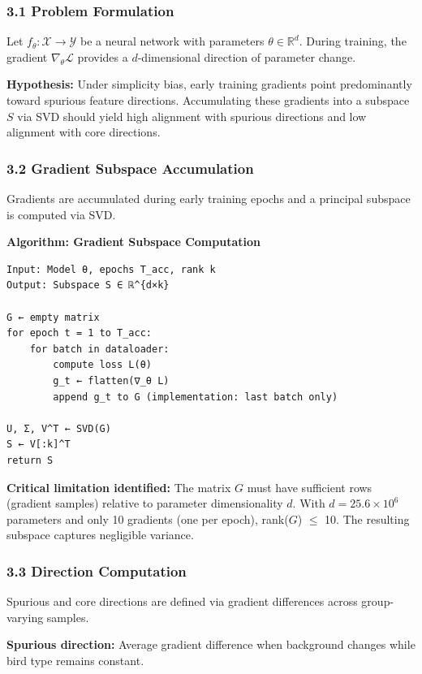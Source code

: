 
\subsubsection{3.1 Problem Formulation}

Let $f_\theta: \mathcal{X} \to \mathcal{Y}$ be a neural network with parameters $\theta \in \mathbb{R}^d$. During training, the gradient $\nabla_\theta \mathcal{L}$ provides a $d$-dimensional direction of parameter change.

\textbf{Hypothesis:} Under simplicity bias, early training gradients point predominantly toward spurious feature directions. Accumulating these gradients into a subspace $S$ via SVD should yield high alignment with spurious directions and low alignment with core directions.

\subsubsection{3.2 Gradient Subspace Accumulation}

Gradients are accumulated during early training epochs and a principal subspace is computed via SVD.

\textbf{Algorithm: Gradient Subspace Computation}

\begin{verbatim}
Input: Model θ, epochs T_acc, rank k
Output: Subspace S ∈ ℝ^{d×k}

G ← empty matrix
for epoch t = 1 to T_acc:
    for batch in dataloader:
        compute loss L(θ)
        g_t ← flatten(∇_θ L)
        append g_t to G (implementation: last batch only)
    
U, Σ, V^T ← SVD(G)
S ← V[:k]^T
return S
\end{verbatim}

\textbf{Critical limitation identified:} The matrix $G$ must have sufficient rows (gradient samples) relative to parameter dimensionality $d$. With $d = 25.6 \times 10^6$ parameters and only 10 gradients (one per epoch), rank($G$) $\leq$ 10. The resulting subspace captures negligible variance.

\subsubsection{3.3 Direction Computation}

Spurious and core directions are defined via gradient differences across group-varying samples.

\textbf{Spurious direction:} Average gradient difference when background changes while bird type remains constant.

